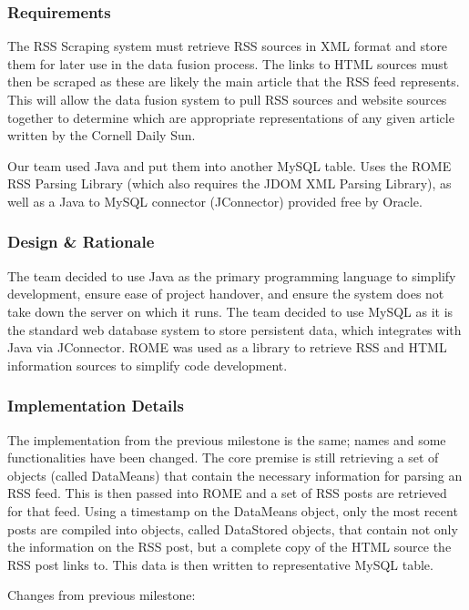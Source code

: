 \documentclass[12pt]{article} %
\begin{document}
\subsubsection{Requirements}

The RSS Scraping system must retrieve RSS sources in XML format and store them for later use in the data fusion process. The links to HTML sources must then be scraped as these are likely the main article that the RSS feed represents. This will allow the data fusion system to pull RSS sources and website sources together to determine which are appropriate representations of any given article written by the Cornell Daily Sun.

Our team used Java and  put them into another MySQL table. Uses the ROME RSS Parsing Library (which also requires the JDOM XML Parsing Library), as well as a Java to MySQL connector (JConnector) provided free by Oracle.

\subsubsection{Design \& Rationale}

The team decided to use Java as the primary programming language to simplify development, ensure ease of project handover, and ensure the system does not take down the server on which it runs. The team decided to use MySQL as it is the standard web database system to store persistent data, which integrates with Java via JConnector. ROME was used as a library to retrieve RSS and HTML information sources to simplify code development.

\subsubsection{Implementation Details}

The implementation from the previous milestone is the same; names and some functionalities have been changed. The core premise is still retrieving a set of objects (called DataMeans) that contain the necessary information for parsing an RSS feed. This is then passed into ROME and a set of RSS posts are retrieved for that feed. Using a timestamp on the DataMeans object, only the most recent posts are compiled into objects, called DataStored objects, that contain not only the information on the RSS post, but a complete copy of the HTML source the RSS post links to. This data is then written to representative MySQL table.

Changes from previous milestone:
\end{document}
